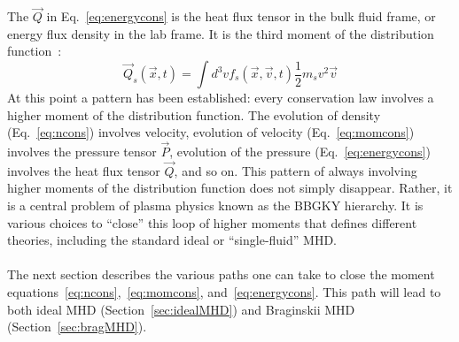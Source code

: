The $\vec Q$ in Eq.~\ref{eq:energycons} is the heat flux tensor in the bulk fluid frame, or energy flux density in the lab frame. It is the third moment of the distribution function~\cite{Hazeltine2004}:
\begin{equation}
  \vec Q_s(\vec x,t)=\int d^3vf_s(\vec x,\vec v,t)\frac12 m_sv^2\vec v
\end{equation}
At this point a pattern has been established: every conservation law involves a higher moment of the distribution function. The evolution of density (Eq.~\ref{eq:ncons}) involves velocity, evolution of velocity (Eq.~\ref{eq:momcons}) involves the pressure tensor $\vec P$, evolution of the pressure (Eq.~\ref{eq:energycons}) involves the heat flux tensor $\vec Q$, and so on. This pattern of always involving higher moments of the distribution function does not simply disappear. Rather, it is a central problem of plasma physics known as the BBGKY hierarchy. It is various choices to ``close'' this loop of higher moments that defines different theories, including the standard ideal or ``single-fluid'' MHD. \\
\\
The next section describes the various paths one can take to close the moment equations~\ref{eq:ncons},~\ref{eq:momcons}, and~\ref{eq:energycons}. This path will lead to both ideal MHD (Section~\ref{sec:idealMHD}) and Braginskii MHD (Section~\ref{sec:bragMHD}).

